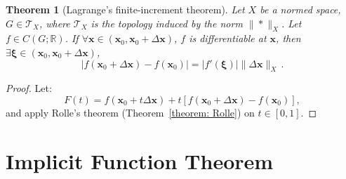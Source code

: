 \documentclass[openany]{book}
\theoremstyle{plain}
\newtheorem{theorem}{Theorem}[section] %
\theoremstyle{definition}
\newcommand*{\bv}{\boldsymbol} %
\begin{document}
\begin{theorem}[Lagrange's finite-increment theorem]
	\label{theorem: Lagrange's finite-increment}
	Let $X$ be a normed space, $G \in \mathscr T_X$, where $\mathscr T_X$ is the topology induced by the norm $\|*\|_X$. 
	Let $f \in C(G; \mathbb R)$. 
	If $\forall \bv x \in (\bv x_0, \bv x_0 + \Delta \bv x)$, $f$ is differentiable at $\bv x$, then $\exists \bv \xi \in (\bv x_0, \bv x_0 + \Delta \bv x)$, 
	\begin{equation*}
		|f(\bv x_0 + \Delta \bv x) - f(\bv x_0)| 
			= |f'(\bv \xi)|  \|\Delta \bv x\|_X\,.
	\end{equation*}
\end{theorem}
\begin{proof}
	Let:
	\begin{equation*}
		F(t) = f(\bv x_0 + t \Delta \bv x) + t [f(\bv x_0 + \Delta \bv x) - f(\bv x_0)],
	\end{equation*}
	and apply Rolle's theorem (Theorem~\ref{theorem: Rolle}) on $t \in [0, 1]$.
\end{proof}

\section{Implicit Function Theorem}
\end{document}
